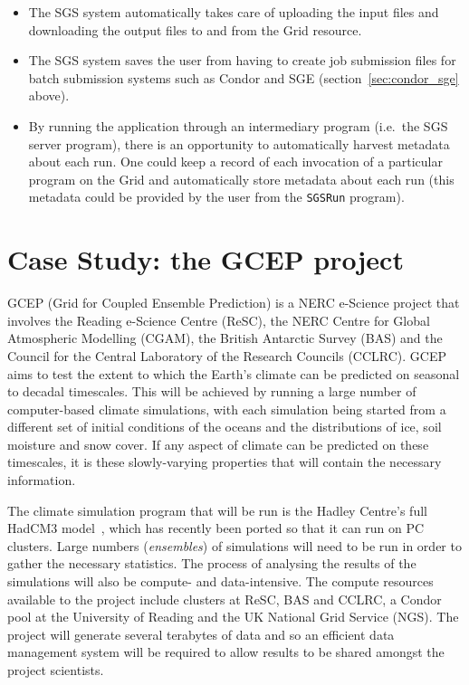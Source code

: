 \documentclass[a4paper]{article}
\begin{document}
\begin{multicols}{2}
\begin{itemize}
\item The SGS system automatically takes care of uploading the input files and downloading the output files to and from the Grid resource.
\item The SGS system saves the user from having to create job submission files for batch submission systems such as Condor and SGE (section~\ref{sec:condor_sge} above).
\item By running the application through an intermediary program (i.e.\ the SGS server program), there is an opportunity to automatically harvest metadata about each run.  One could keep a record of each invocation of a particular program on the Grid and automatically store metadata about each run (this metadata could be provided by the user from the {\tt SGSRun} program).
\end{itemize}

\section{Case Study: the GCEP project}
GCEP (Grid for Coupled Ensemble Prediction) is a NERC e-Science project that involves the Reading e-Science Centre (ReSC), the NERC Centre for Global Atmospheric Modelling (CGAM), the British Antarctic Survey (BAS) and the Council for the Central Laboratory of the Research Councils (CCLRC).  GCEP aims to test the extent to which the Earth's climate can be predicted on seasonal to decadal timescales.  This will be achieved by running a large number of computer-based climate simulations, with each simulation being started from a different set of initial conditions of the oceans and the distributions of ice, soil moisture and snow cover.  If any aspect of climate can be predicted on these timescales, it is these slowly-varying properties that will contain the necessary information.

The climate simulation program that will be run is the Hadley Centre's full HadCM3 model~\cite{hadcm3}, which has recently been ported so that it can run on PC clusters.  Large numbers ({\em ensembles\/}) of simulations will need to be run in order to gather the necessary statistics.  The process of analysing the results of the simulations will also be compute- and data-intensive.  The compute resources available to the project include clusters at ReSC, BAS and CCLRC, a Condor pool at the University of Reading and the UK National Grid Service (NGS).  The project will generate several terabytes of data and so an efficient data management system will be required to allow results to be shared amongst the project scientists.


\end{multicols}
\end{document}
